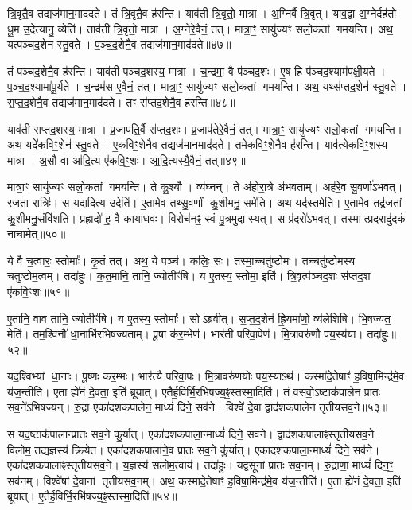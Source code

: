 त्रि॒वृतै॒व तद्यज॑मान॒माद॑दते।
तं त्रि॒वृतै॒व ह॑रन्ति।
याव॑ती त्रि॒वृतो॒ मात्रा।
अ॒ग्निर्वै त्रि॒वृत्।
याव॒द्वा अ॒ग्नेर्दह॑तो धू॒म उ॒देत्यानु॒ व्येति॑।
ताव॑ती त्रि॒वृतो॒ मात्रा।
अ॒ग्नेरे॒वैनं॒ तत्।
मात्रा॒ꣳ॒ सायु॑ज्यꣳ सलो॒कतां गमयन्ति।
अथ॒ यत्प॑ञ्चद॒शेन॑ स्तु॒वते।
प॒ञ्च॒द॒शेनै॒व तद्यज॑मान॒माद॑दते॥४७॥

तं प॑ञ्चद॒शेनै॒व ह॑रन्ति।
याव॑ती पञ्चद॒शस्य॒ मात्रा।
च॒न्द्रमा॒ वै प॑ञ्चद॒शः।
ए॒ष हि प॑ञ्चद॒श्याम॑पक्षी॒यते।
प॒ञ्च॒द॒श्यामा॑पू॒र्यते।
च॒न्द्रम॑स ए॒वैनं॒ तत्।
मात्रा॒ꣳ॒ सायु॑ज्यꣳ सलो॒कतां गमयन्ति।
अथ॒ यथ्स॑प्तद॒शेन॑ स्तु॒वते।
स॒प्त॒द॒शेनै॒व तद्यज॑मान॒माद॑दते।
तꣳ स॑प्तद॒शेनै॒व ह॑रन्ति॥४८॥

याव॑ती सप्तद॒शस्य॒ मात्रा।
प्र॒जाप॑ति॒र्वै स॑प्तद॒शः।
प्र॒जाप॑तेरे॒वैनं॒ तत्।
मात्रा॒ꣳ॒ सायु॑ज्यꣳ सलो॒कतां गमयन्ति।
अथ॒ यदे॑कवि॒ꣳ॒शेन॑ स्तु॒वते।
ए॒क॒वि॒ꣳ॒शेनै॒व तद्यज॑मान॒माद॑दते।
तमे॑कवि॒ꣳ॒शेनै॒व ह॑रन्ति।
याव॑त्येक\-वि॒ꣳ॒शस्य॒ मात्रा।
अ॒सौ वा आ॑दि॒त्य ए॑कवि॒ꣳ॒शः।
आ॒दि॒त्यस्यै॒वैनं॒ तत्॥४९॥

मात्रा॒ꣳ॒ सायु॑ज्यꣳ सलो॒कतां गमयन्ति।
ते कु॒श्यौ।
व्य॑घ्नन्।
ते अ॑होरा॒त्रे अ॑भवताम्।
अह॑रे॒व सु॒वर्णा॑\-ऽभवत्।
र॒ज॒ता रात्रिः॑।
स यदा॑दि॒त्य उ॒देति॑।
ए॒तामे॒व तथ्सु॒वर्णां कु॒शीमनु॒ समे॑ति।
अथ॒ यद॑स्त॒मेति॑।
ए॒तामे॒व तद्र॑ज॒तां कु॒शीमनु॒संवि॑शति।
प्र॒ह्रादो॑ ह॒ वै का॑याध॒वः।
वि॒रोच॑न॒ꣴ॒ स्वं पु॒त्रमुदास्यत्।
स प्र॑द॒रो॑\-ऽभवत्।
तस्मात्प्रद॒रादु॑द॒कं नाचा॑मेत्॥५०॥\anuvakamend[आ॒दि॒त्यः प॑ञ्चद॒शस्य॒ मात्रा स्तु॒वते॑ पञ्चद॒शेनै॒व तद्यज॑मान॒माद॑दते सप्तद॒शेनै॒व ह॑रन्त्यादि॒त्यस्यै॒वैनं॒ तद्वि॑शति च॒त्वारि॑ च]

ये वै च॒त्वारः॒ स्तोमाः᳚।
कृ॒तं तत्।
अथ॒ ये पञ्च॑।
कलिः॒ सः।
तस्मा॒च्चतु॑ष्टोमः।
तच्चतु॑ष्टोमस्य चतुष्टोम॒त्वम्।
तदा॑हुः।
क॒त॒मानि॒ तानि॒ ज्योतीꣳ॑षि।
य ए॒तस्य॒ स्तोमा॒ इति॑।
त्रि॒वृत्प॑ञ्चद॒शः स॑प्तद॒श ए॑कवि॒ꣳ॒शः॥५१॥

ए॒तानि॒ वाव तानि॒ ज्योतीꣳ॑षि।
य ए॒तस्य॒ स्तोमाः᳚।
सोऽब्रवीत्।
स॒प्त॒द॒शेन॑ ह्रि॒यमा॑णो॒ व्य॑लेशिषि।
भि॒षज्य॑त॒ मेति॑।
तम॒श्विनौ॑ धा॒नाभि॑रभिषज्यताम्।
पू॒षा क॑र॒म्भेण॑।
भार॑ती परिवा॒पेण॑।
मि॒त्रावरु॑णौ पय॒स्य॑या।
तदा॑हुः॥५२॥

यद॒श्विभ्यां धा॒नाः।
पू॒ष्णः क॑र॒म्भः।
भार॑त्यै परिवा॒पः।
मि॒त्रावरु॑णयोः पय॒स्याऽथ॑।
कस्मा॑दे॒तेषाꣳ॑ ह॒विषा॒मिन्द्र॑मे॒व य॑ज॒न्तीति॑।
ए॒ता ह्ये॑नं दे॒वता॒ इति॑ ब्रूयात्।
ए॒तैर्\mbox{}ह॒विर्भि॒\-रभि॑षज्य॒ꣴ॒स्तस्मा॒दिति॑।
तं वस॑वो॒\-ऽष्टाक॑पालेन प्रातः सव॒ने॑\-ऽभिषज्यन्।
रु॒द्रा एका॑दशकपालेन॒ माध्यं॑ दिने॒ सव॑ने।
विश्वे॑ दे॒वा द्वाद॑शकपालेन तृतीयसव॒ने॥५३॥

स यद॒ष्टाक॑पालान्प्रातः सव॒ने कु॒र्यात्।
एका॑दश\-कपाला॒न्माध्यं॑ दिने॒ सव॑ने।
द्वाद॑श\-कपालाꣴस्तृतीयसव॒ने।
विलो॑म॒ तद्य॒ज्ञस्य॑ क्रियेत।
एका॑दश\-कपालाने॒व प्रा॑तः सव॒ने कु॑र्यात्।
एका॑दश\-कपाला॒न्माध्यं॑ दिने॒ सव॑ने।
एका॑दश\-कपालाꣴ\-स्तृतीयसव॒ने।
य॒ज्ञस्य॑ सलोम॒त्वाय॑।
तदा॑हुः।
यद्वसू॑नां प्रातः सव॒नम्।
रु॒द्राणां॒ माध्यं॑ दिन॒ꣳ॒ सव॑नम्।
विश्वे॑षां दे॒वानां तृतीयसव॒नम्।
अथ॒ कस्मा॑दे॒तेषाꣳ॑ ह॒विषा॒मिन्द्र॑मे॒व य॑ज॒न्तीति॑।
ए॒ता ह्ये॑नं दे॒वता॒ इति॑ ब्रूयात्।
ए॒तैर्\-\mbox{}ह॒विर्भि॒रभि॑\-षज्य॒ꣴ॒स्तस्मा॒दिति॑॥५४॥\anuvakamend[ए॒क॒वि॒ꣳ॒श आ॑हुस्तृतीयसव॒ने प्रा॑तः सव॒नं पञ्च॑ च]

